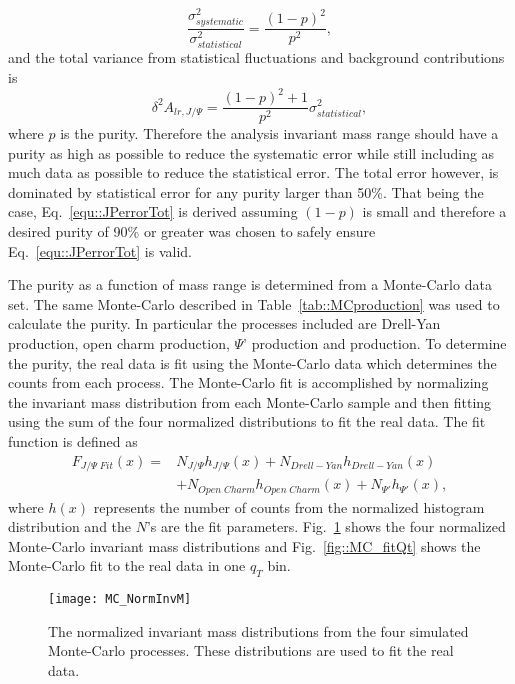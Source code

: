 \begin{equation}
  \frac{\sigma^2_{systematic}}{\sigma^2_{statistical}} = \frac{(1-p)^2}{p^2},
\end{equation}
\noindent
and the total variance from statistical fluctuations and background
contributions is
\begin{equation}
  \delta^2 A_{lr,J/\Psi} = \frac{(1-p)^2 + 1}{p^2}\sigma^2_{statistical},
  \label{equ::JPerrorTot}
\end{equation}
where $p$ is the {\jp} purity.  Therefore the analysis invariant mass range
should have a {\jp} purity as high as possible to reduce the systematic error
while still including as much data as possible to reduce the statistical error.
The total error however, is dominated by statistical error for any purity larger
than 50\%.  That being the case, Eq.~\ref{equ::JPerrorTot} is derived assuming
$(1-p)$ is small and therefore a desired purity of 90\% or greater was chosen to
safely ensure Eq.~\ref{equ::JPerrorTot} is valid.

The {\jp} purity as a function of mass range is determined from a Monte-Carlo
data set.  The same Monte-Carlo described in Table~\ref{tab::MCproduction} was
used to calculate the {\jp} purity.  In particular the processes included are
Drell-Yan production, open charm production, $\Psi$' production and {\jp}
production.  To determine the purity, the real data is fit using the Monte-Carlo
data which determines the counts from each process.  The Monte-Carlo fit is
accomplished by normalizing the invariant mass distribution from each
Monte-Carlo sample and then fitting using the sum of the four normalized
distributions to fit the real data.  The fit function is defined as
\begin{align}
  F_{J/\Psi \;Fit}(x) = &N_{J/\Psi}h_{J/\Psi}(x) + N_{Drell-Yan}h_{Drell-Yan}(x)
  \\ \nonumber
  &+ N_{Open\;Charm}h_{Open\;Charm}(x)+N_{\Psi'}h_{\Psi'}(x),
\end{align}
\noindent
where $h(x)$ represents the number of counts from the normalized histogram
distribution and the $N$'s are the fit parameters.  Fig.~\ref{fig::MC_NormInvM}
shows the four normalized Monte-Carlo invariant mass distributions and
Fig.~\ref{fig::MC_fitQt} shows the Monte-Carlo fit to the real data in one $q_T$
bin.

\begin{figure}[h!t]
  \centering
  \texttt{[image: MC\_NormInvM]}
  \caption{The normalized invariant mass distributions from the four simulated
    Monte-Carlo processes.  These distributions are used to fit the real data.}
  \label{fig::MC_NormInvM}
\end{figure}

